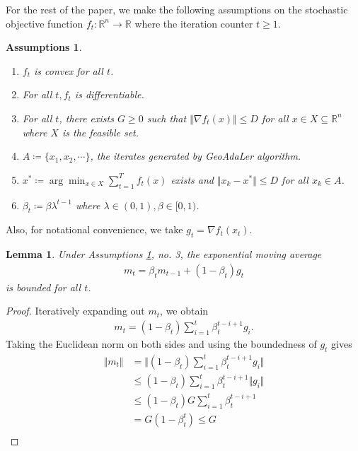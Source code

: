 \documentclass{article}
\newtheorem{lemma}{Lemma}
\newtheorem{assumptions}{Assumptions}
\begin{document}
\noindent
For the rest of the paper, we make the following assumptions on the stochastic objective function $f_t:\mathbb{R}^n \to \mathbb{R}$ where the iteration counter $t\ge 1$.
\begin{assumptions}\label{stochastic-assume}
\begin{enumerate}
\item $f_t$ is convex for all $t$.
\item For all $t, f_t$ is differentiable.
\item For all $t$, there exists $G\ge 0$ such that $\Vert\nabla f_t(x)\Vert \le D$ for all $x \in X \subseteq \mathbb{R}^n$ where $X$ is the feasible set.
\item $A\coloneqq \{x_1,x_2, \cdots\}$, the iterates generated by GeoAdaLer algorithm.
\item $ x^* \coloneqq \arg\min_{x\in X} \sum_{t=1}^T f_t(x)$ exists and $\Vert x_k - x^*\Vert \le D$ for all $x_k \in A$.
\item $\beta_t \coloneqq \beta \lambda^{t-1}$ where $\lambda \in (0,1), \beta \in [0,1)$.
\end{enumerate}
\end{assumptions}
\noindent
Also, for notational convenience, we take $g_t = \nabla f_t(x_t)$.

\begin{lemma}\label{mt-bounded}
Under Assumptions \ref{stochastic-assume}, no. 3, the exponential moving average
\begin{align}
m_t = \beta_t m_{t-1} +  (1-\beta_t) g_t
\end{align}
is bounded for all  $t$.
\end{lemma}
\begin{proof}
Iteratively expanding out $m_t$, we obtain
\begin{align*}
m_t = (1-\beta_t) \sum_{i=1}^t \beta_t^{t-i+1} g_{i}.
\end{align*}
Taking the Euclidean norm on both sides and using the boundedness of $g_t$ gives
\begin{align*}
\Vert m_t \Vert &= \Vert (1-\beta_t) \sum_{i=1}^t \beta_t^{t-i+1} g_{i}  \Vert\\
                &\leq (1-\beta_t) \sum_{i=1}^t \beta_t^{t-i+1} \Vert g_{i} \Vert\\
                & \leq (1-\beta_t) G \sum_{i=1}^t \beta_t^{t-i+1}\\
                & = G (1 - \beta_t^t) \leq G\\
\end{align*}
\end{proof}
\end{document}

